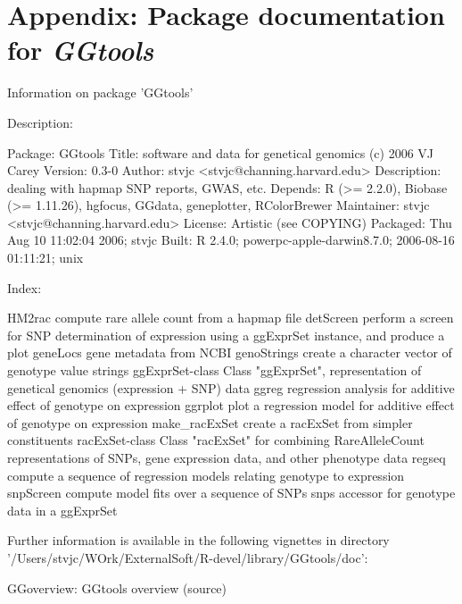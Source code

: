 \documentclass[12pt]{article}
\newcommand{\Rpackage}[1]{{\textit{#1}}}
\begin{document}
\section{Appendix: Package documentation for \Rpackage{GGtools}}
\begin{Schunk}
\begin{Soutput}
		Information on package 'GGtools'

Description:


Package:       GGtools
Title:         software and data for genetical genomics (c) 2006 VJ
               Carey
Version:       0.3-0
Author:        stvjc <stvjc@channing.harvard.edu>
Description:   dealing with hapmap SNP reports, GWAS, etc.
Depends:       R (>= 2.2.0), Biobase (>= 1.11.26), hgfocus, GGdata,
               geneplotter, RColorBrewer
Maintainer:    stvjc <stvjc@channing.harvard.edu>
License:       Artistic (see COPYING)
Packaged:      Thu Aug 10 11:02:04 2006; stvjc
Built:         R 2.4.0; powerpc-apple-darwin8.7.0; 2006-08-16 01:11:21;
               unix


Index:


HM2rac                  compute rare allele count from a hapmap file
detScreen               perform a screen for SNP determination of
                        expression using a ggExprSet instance, and
                        produce a plot
geneLocs                gene metadata from NCBI
genoStrings             create a character vector of genotype value
                        strings
ggExprSet-class         Class "ggExprSet", representation of genetical
                        genomics (expression + SNP) data
ggreg                   regression analysis for additive effect of
                        genotype on expression
ggrplot                 plot a regression model for additive effect of
                        genotype on expression
make_racExSet           create a racExSet from simpler constituents
racExSet-class          Class "racExSet" for combining RareAlleleCount
                        representations of SNPs, gene expression data,
                        and other phenotype data
regseq                  compute a sequence of regression models
                        relating genotype to expression
snpScreen               compute model fits over a sequence of SNPs
snps                    accessor for genotype data in a ggExprSet


Further information is available in the following vignettes in
directory '/Users/stvjc/WOrk/ExternalSoft/R-devel/library/GGtools/doc':


GGoverview: GGtools overview (source)
\end{Soutput}
\end{Schunk}
\end{document}
